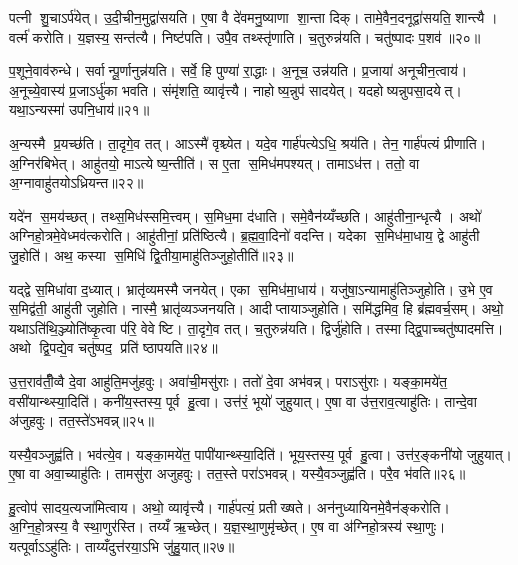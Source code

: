 पत्नी शु॒चाऽर्प॑येत्। उ॒दी॒चीन॒मुद्वा॑सयति। ए॒षा वै दे॑वमनु॒ष्याणा शा॒न्ता दिक्। तामे॒वैन॒दनूद्वा॑सयति॒ शान्त्यै। वर्त्म॑ करोति। य॒ज्ञस्य॒ सन्त॑त्यै। निष्ट॑पति। उपै॒व तथ्स्तृ॑णाति। च॒तुरुन्न॑यति। चतु॑ष्पादः प॒शव॑॥२०॥

प॒शूने॒वाव॑रुन्धे। सर्वान्पू॒र्णानुन्न॑यति। सर्वे॒ हि पुण्या॑ रा॒द्धाः। अ॒नूच॒ उन्न॑यति। प्र॒जाया॑ अनूचीन॒त्वाय॑। अ॒नूच्ये॒वास्य॑ प्र॒जाऽर्धु॑का भवति। संमृ॑शति॒ व्यावृ॑त्त्यै। नाहोष्य॒न्नुप॑ सादयेत्। यदहोष्यन्नुपसा॒दयेत्। यथा॒ऽन्यस्मा॑ उपनि॒धाय॑॥२१॥

अ॒न्यस्मै प्र॒यच्छ॑ति। ता॒दृगे॒व तत्। आऽस्मै॑ वृश्च्येत। यदे॒व गार्\mbox{}ह॑पत्येऽधि॒ श्रय॑ति। तेन॒ गार्\mbox{}ह॑पत्यं प्रीणाति। अ॒ग्निर॑बिभेत्। आहु॑तयो॒ माऽत्येष्य॒न्तीति॑। स ए॒ता स॒मिध॑मपश्यत्। तामाऽध॑त्त। ततो॒ वा अ॒ग्नावाहु॑तयोऽध्रियन्त॥२२॥

यदे॑न स॒मय॑च्छत्। तथ्स॒मिध॑स्समि॒त्त्वम्। स॒मिध॒मा द॑धाति। समे॒वैन॑य्यँच्छति। आहु॑तीना॒न्धृत्यै। अथो॑ अग्निहो॒त्रमे॒वेध्मव॑त्करोति। आहु॑तीनां॒ प्रति॑ष्ठित्यै। ब्र॒ह्म॒वा॒दिनो॑ वदन्ति। यदेका स॒मिध॑मा॒धाय॒ द्वे आहु॑ती जु॒होति॑। अथ॒ कस्या स॒मिधि॑ द्वि॒तीया॒माहु॑तिञ्जुहो॒तीति॑॥२३॥

यद्द्वे स॒मिधा॑वा द॒ध्यात्। भ्रातृ॑व्यमस्मै जनयेत्। एका स॒मिध॑मा॒धाय॑। यजु॑षा॒ऽन्यामाहु॑तिञ्जुहोति। उ॒भे ए॒व स॒मिद्व॑ती॒ आहु॑ती जुहोति। नास्मै॒ भ्रातृ॑व्यञ्जनयति। आदीप्तायाञ्जुहोति। समि॑द्धमिव॒ हि ब्र॑ह्मवर्च॒सम्। अथो॒ यथाऽति॑थि॒ञ्ज्योति॑ष्कृ॒त्वा प॑रि॒ वेवेष्टि। ता॒दृगे॒व तत्। च॒तुरुन्न॑यति। द्विर्जु॑होति। तस्माद्द्वि॒पाच्चतु॑ष्पादमत्ति। अथो द्वि॒पद्ये॒व चतु॑ष्पद॒ प्रति॑ ष्ठापयति॥२४॥

उ॒त्त॒राव॑तीँ॒व्वै दे॒वा आहु॑ति॒मजु॑हवुः। अवा॑ची॒मसु॑राः। ततो॑ दे॒वा अभ॑वन्न्। पराऽसु॑राः। यङ्का॒मये॑त॒ वसी॑यान्थ्स्या॒दिति॑। कनी॑य॒स्तस्य॒ पूर्व हु॒त्वा। उत्त॑रं॒ भूयो॑ जुहुयात्। ए॒षा वा उ॑त्त॒राव॒त्याहु॑तिः। तान्दे॒वा अ॑जुहवुः। तत॒स्ते॑ऽभवन्न्॥२५॥

यस्यै॒वञ्जुह्व॑ति। भव॑त्ये॒व। यङ्का॒मये॑त॒ पापी॑यान्थ्स्या॒दिति॑। भूय॒स्तस्य॒ पूर्व हु॒त्वा। उत्त॑र॒ङ्कनी॑यो जुहुयात्। ए॒षा वा अवा॒च्याहु॑तिः। तामसु॑रा अजुहवुः। तत॒स्ते परा॑ऽभवन्न्। यस्यै॒वञ्जुह्व॑ति। परै॒व भ॑वति॥२६॥

हु॒त्वोप॑ सादय॒त्यजा॑मित्वाय। अथो॒ व्यावृ॑त्त्यै। गार्\mbox{}ह॑पत्यं॒ प्रतीख्षते। अन॑नुध्यायिनमे॒वैन॑ङ्करोति। अ॒ग्नि॒हो॒त्रस्य॒ वै स्था॒णुर॑स्ति। तय्यँ ऋ॒च्छेत्। य॒ज्ञ॒स्था॒णुमृ॑च्छेत्। ए॒ष वा अ॑ग्निहो॒त्रस्य॑ स्था॒णुः। यत्पूर्वाऽऽहु॑तिः। ताय्यँदुत्त॑रया॒ऽभि जु॑हु॒यात्॥२७॥

